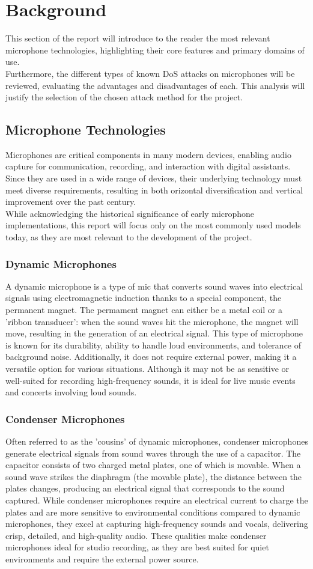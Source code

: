 \chapter{Background}
This section of the report will introduce to the reader the most relevant microphone technologies, highlighting their core features and primary domains of use.\\
Furthermore, the different types of known DoS attacks on microphones will be reviewed, evaluating the advantages and disadvantages of each. This analysis will justify the selection of the chosen attack method for the project.
\section{Microphone Technologies}
Microphones are critical components in many modern devices, enabling audio capture for communication, recording, and interaction with digital assistants.
Since they are used in a wide range of devices, their underlying technology must meet diverse requirements, resulting in both orizontal diversification and vertical improvement over the past century.\\
While acknowledging the historical significance of early microphone implementations, this report will focus only on the most commonly used models today, as they are most relevant to the development of the project.
\subsection{Dynamic Microphones}
A dynamic microphone is a type of mic that converts sound waves into electrical signals using electromagnetic induction thanks to a special component, the permanent magnet.
The permament magnet can either be a metal coil or a 'ribbon transducer': when the sound waves hit the microphone, the magnet will move, resulting in the generation of an electrical signal.
This type of microphone is known for its durability, ability to handle loud environments, and tolerance of background noise.
Additionally, it does not require external power, making it a versatile option for various situations.
Although it may not be as sensitive or well-suited for recording high-frequency sounds, it is ideal for live music events and concerts involving loud sounds.
\subsection{Condenser Microphones}
Often referred to as the 'cousins' of dynamic microphones, condenser microphones generate electrical signals from sound waves through the use of a capacitor.
The capacitor consists of two charged metal plates, one of which is movable.
When a sound wave strikes the diaphragm (the movable plate), the distance between the plates changes, producing an electrical signal that corresponds to the sound captured.
While condenser microphones require an electrical current to charge the plates and are more sensitive to environmental conditions compared to dynamic microphones, they excel at capturing high-frequency sounds and vocals, delivering crisp, detailed, and high-quality audio.
These qualities make condenser microphones ideal for studio recording, as they are best suited for quiet environments and require the external power source.
